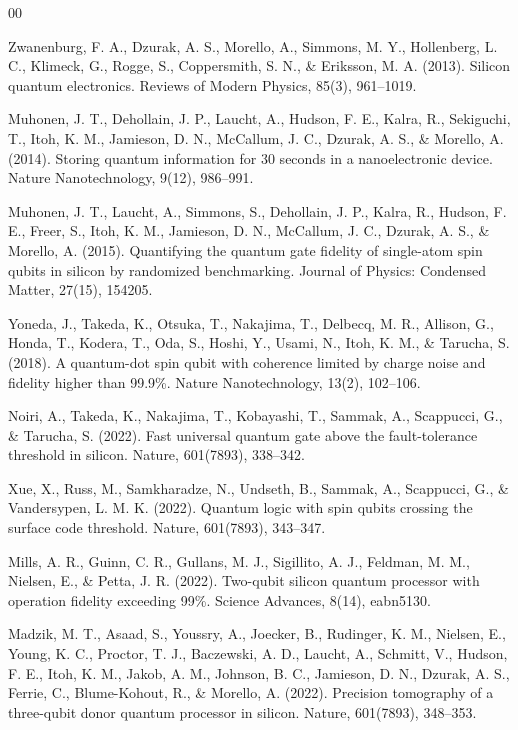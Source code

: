 \documentclass[preprint,12pt, a4paper]{elsarticle}
\begin{document}
\begin{thebibliography}{00}

 Zwanenburg, F. A., Dzurak, A. S., Morello, A., Simmons, M. Y., Hollenberg, L. C., Klimeck, G., Rogge, S., Coppersmith, S. N., \& Eriksson, M. A. (2013). Silicon quantum electronics. Reviews of Modern Physics, 85(3), 961--1019.

 Muhonen, J. T., Dehollain, J. P., Laucht, A., Hudson, F. E., Kalra, R., Sekiguchi, T., Itoh, K. M., Jamieson, D. N., McCallum, J. C., Dzurak, A. S., \& Morello, A. (2014). Storing quantum information for 30 seconds in a nanoelectronic device. Nature Nanotechnology, 9(12), 986--991.

 Muhonen, J. T., Laucht, A., Simmons, S., Dehollain, J. P., Kalra, R., Hudson, F. E., Freer, S., Itoh, K. M., Jamieson, D. N., McCallum, J. C., Dzurak, A. S., \& Morello, A. (2015). Quantifying the quantum gate fidelity of single-atom spin qubits in silicon by randomized benchmarking. Journal of Physics: Condensed Matter, 27(15), 154205.

 Yoneda, J., Takeda, K., Otsuka, T., Nakajima, T., Delbecq, M. R., Allison, G., Honda, T., Kodera, T., Oda, S., Hoshi, Y., Usami, N., Itoh, K. M., \& Tarucha, S. (2018). A quantum-dot spin qubit with coherence limited by charge noise and fidelity higher than 99.9\%. Nature Nanotechnology, 13(2), 102--106.

 Noiri, A., Takeda, K., Nakajima, T., Kobayashi, T., Sammak, A., Scappucci, G., \& Tarucha, S. (2022). Fast universal quantum gate above the fault-tolerance threshold in silicon. Nature, 601(7893), 338--342.

 Xue, X., Russ, M., Samkharadze, N., Undseth, B., Sammak, A., Scappucci, G., \& Vandersypen, L. M. K. (2022). Quantum logic with spin qubits crossing the surface code threshold. Nature, 601(7893), 343--347.

 Mills, A. R., Guinn, C. R., Gullans, M. J., Sigillito, A. J., Feldman, M. M., Nielsen, E., \& Petta, J. R. (2022). Two-qubit silicon quantum processor with operation fidelity exceeding 99\%. Science Advances, 8(14), eabn5130.

 Madzik, M. T., Asaad, S., Youssry, A., Joecker, B., Rudinger, K. M., Nielsen, E., Young, K. C., Proctor, T. J., Baczewski, A. D., Laucht, A., Schmitt, V., Hudson, F. E., Itoh, K. M., Jakob, A. M., Johnson, B. C., Jamieson, D. N., Dzurak, A. S., Ferrie, C., Blume-Kohout, R., \& Morello, A. (2022). Precision tomography of a three-qubit donor quantum processor in silicon. Nature, 601(7893), 348--353.


\end{thebibliography}
\end{document}
